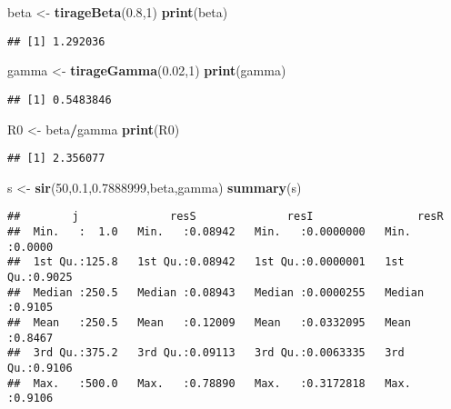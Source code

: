 \documentclass[
]{article}
\newenvironment{Shaded}{\begin{snugshade}}{\end{snugshade}}
\newcommand{\DecValTok}[1]{\textcolor[rgb]{0.00,0.00,0.81}{#1}}
\newcommand{\FloatTok}[1]{\textcolor[rgb]{0.00,0.00,0.81}{#1}}
\newcommand{\KeywordTok}[1]{\textcolor[rgb]{0.13,0.29,0.53}{\textbf{#1}}}
\newcommand{\NormalTok}[1]{#1}
\newcommand{\OperatorTok}[1]{\textcolor[rgb]{0.81,0.36,0.00}{\textbf{#1}}}
\newcommand{\StringTok}[1]{\textcolor[rgb]{0.31,0.60,0.02}{#1}}
\begin{document}
\begin{Shaded}
\begin{Highlighting}[]
\NormalTok{beta <-}\StringTok{ }\KeywordTok{tirageBeta}\NormalTok{(}\FloatTok{0.8}\NormalTok{,}\DecValTok{1}\NormalTok{)}
\KeywordTok{print}\NormalTok{(beta)}
\end{Highlighting}
\end{Shaded}

\begin{verbatim}
## [1] 1.292036
\end{verbatim}

\begin{Shaded}
\begin{Highlighting}[]
\NormalTok{gamma <-}\StringTok{ }\KeywordTok{tirageGamma}\NormalTok{(}\FloatTok{0.02}\NormalTok{,}\DecValTok{1}\NormalTok{)}
\KeywordTok{print}\NormalTok{(gamma)}
\end{Highlighting}
\end{Shaded}

\begin{verbatim}
## [1] 0.5483846
\end{verbatim}

\begin{Shaded}
\begin{Highlighting}[]
\NormalTok{R0 <-}\StringTok{ }\NormalTok{beta}\OperatorTok{/}\NormalTok{gamma}
\KeywordTok{print}\NormalTok{(R0)}
\end{Highlighting}
\end{Shaded}

\begin{verbatim}
## [1] 2.356077
\end{verbatim}

\begin{Shaded}
\begin{Highlighting}[]
\NormalTok{s <-}\StringTok{ }\KeywordTok{sir}\NormalTok{(}\DecValTok{50}\NormalTok{,}\FloatTok{0.1}\NormalTok{,}\FloatTok{0.7888999}\NormalTok{,beta,gamma)}
\KeywordTok{summary}\NormalTok{(s)}
\end{Highlighting}
\end{Shaded}

\begin{verbatim}
##        j              resS              resI                resR       
##  Min.   :  1.0   Min.   :0.08942   Min.   :0.0000000   Min.   :0.0000  
##  1st Qu.:125.8   1st Qu.:0.08942   1st Qu.:0.0000001   1st Qu.:0.9025  
##  Median :250.5   Median :0.08943   Median :0.0000255   Median :0.9105  
##  Mean   :250.5   Mean   :0.12009   Mean   :0.0332095   Mean   :0.8467  
##  3rd Qu.:375.2   3rd Qu.:0.09113   3rd Qu.:0.0063335   3rd Qu.:0.9106  
##  Max.   :500.0   Max.   :0.78890   Max.   :0.3172818   Max.   :0.9106
\end{verbatim}
\end{document}
